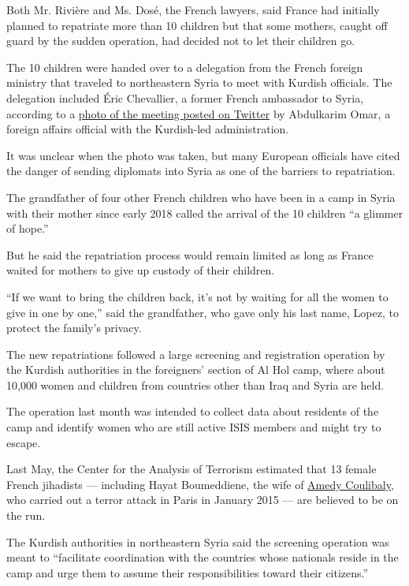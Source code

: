 Both Mr. Rivière and Ms. Dosé, the French lawyers, said France had
initially planned to repatriate more than 10 children but that some
mothers, caught off guard by the sudden operation, had decided not to
let their children go.

The 10 children were handed over to a delegation from the French foreign
ministry that traveled to northeastern Syria to meet with Kurdish
officials. The delegation included Éric Chevallier, a former French
ambassador to Syria, according to a
\href{https://twitter.com/abdulkarimomar1/status/1274860769750941696}{photo
of the meeting posted on Twitter} by Abdulkarim Omar, a foreign affairs
official with the Kurdish-led administration.

It was unclear when the photo was taken, but many European officials
have cited the danger of sending diplomats into Syria as one of the
barriers to repatriation.

The grandfather of four other French children who have been in a camp in
Syria with their mother since early 2018 called the arrival of the 10
children ``a glimmer of hope.''

But he said the repatriation process would remain limited as long as
France waited for mothers to give up custody of their children.

``If we want to bring the children back, it's not by waiting for all the
women to give in one by one,'' said the grandfather, who gave only his
last name, Lopez, to protect the family's privacy.

The new repatriations followed a large screening and registration
operation by the Kurdish authorities in the foreigners' section of Al
Hol camp, where about 10,000 women and children from countries other
than Iraq and Syria are held.

The operation last month was intended to collect data about residents of
the camp and identify women who are still active ISIS members and might
try to escape.

Last May, the Center for the Analysis of Terrorism estimated that 13
female French jihadists --- including Hayat Boumeddiene, the wife of
\href{https://www.nytimes.com/2015/01/11/world/europe/neighbors-say-suspect-in-french-attacks-and-his-companion-lived-quiet-lives.html}{Amedy
Coulibaly}, who carried out a terror attack in Paris in January 2015 ---
are believed to be on the run.

The Kurdish authorities in northeastern Syria said the screening
operation was meant to ``facilitate coordination with the countries
whose nationals reside in the camp and urge them to assume their
responsibilities toward their citizens.''

